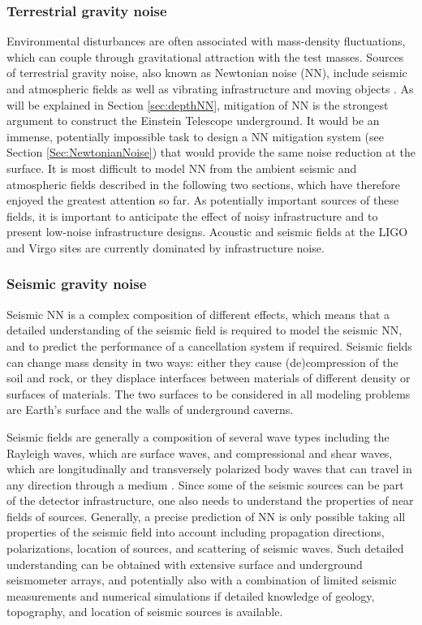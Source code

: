 \subsubsection*{Terrestrial gravity noise}
Environmental disturbances are often associated with mass-density fluctuations, which can couple through gravitational attraction with the test masses. Sources of terrestrial gravity noise, also known as Newtonian noise (NN), include seismic and atmospheric fields as well as vibrating infrastructure and moving objects \cite{Har2015}. As will be explained in Section \ref{sec:depthNN}, mitigation of NN is the strongest argument to construct the Einstein Telescope underground. It would be an immense, potentially impossible task to design a NN mitigation system (see Section \ref{Sec:NewtonianNoise}) that would provide the same noise reduction at the surface. It is most difficult to model NN from the ambient seismic and atmospheric fields described in the following two sections, which have therefore enjoyed the greatest attention so far. As potentially important sources of these fields, it is important to anticipate the effect of noisy infrastructure and to present low-noise infrastructure designs. Acoustic and seismic fields at the LIGO and Virgo sites are currently dominated by infrastructure noise.

\subsubsection*{Seismic gravity noise}
Seismic NN is a complex composition of different effects, which means that a detailed understanding of the seismic field is required to model the seismic NN, and to predict the performance of a cancellation system if required. Seismic fields can change mass density in two ways: either they cause (de)compression of the soil and rock, or they displace interfaces between materials of different density or surfaces of materials. The two surfaces to be considered in all modeling problems are Earth's surface and the walls of underground caverns.

Seismic fields are generally a composition of several wave types including the Rayleigh waves, which are surface waves, and compressional and shear waves, which are longitudinally and transversely polarized body waves that can travel in any direction through a medium \cite{AkRi2009}. Since some of the seismic sources can be part of the detector infrastructure, one also needs to understand the properties of near fields of sources. Generally, a precise prediction of NN is only possible taking all properties of the seismic field into account including propagation directions, polarizations, location of sources, and scattering of seismic waves. Such detailed understanding can be obtained with extensive surface and underground seismometer arrays, and potentially also with a combination of limited seismic measurements and numerical simulations if detailed knowledge of geology, topography, and location of seismic sources is available. 

